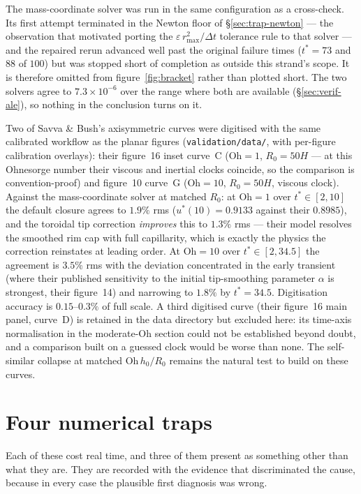 \documentclass[11pt,a4paper]{article}
\newcommand{\Oh}{\mathrm{Oh}}
\begin{document}
The mass-coordinate solver was run in the same configuration as a
cross-check. Its first attempt terminated in the Newton floor of
\S\ref{sec:trap-newton} --- the observation that motivated porting the
$\varepsilon\,r_{\max}^{2}/\Delta t$ tolerance rule to that solver --- and the
repaired rerun advanced well past the original failure times ($t^{*} = 73$ and
$88$ of $100$) but was stopped short of completion as outside this strand's
scope. It is therefore omitted from figure~\ref{fig:bracket} rather than
plotted short. The two solvers agree to $7.3\times10^{-6}$ over the range where
both are available (\S\ref{sec:verif-ale}), so nothing in the conclusion turns
on it.

Two of Savva \& Bush's axisymmetric curves were digitised with the same
calibrated workflow as the planar figures (\texttt{validation/data/}, with
per-figure calibration overlays): their figure~16 inset curve~C
($\Oh = 1$, $R_{0} = 50H$ --- at this Ohnesorge number their
viscous and inertial clocks coincide, so the comparison is
convention-proof) and figure~10 curve~G ($\Oh = 10$,
$R_{0} = 50H$, viscous clock). Against the mass-coordinate solver at matched
$R_{0}$: at $\Oh = 1$ over $t^{*} \in [2, 10]$ the default
closure agrees to $1.9\%$ rms ($u^{*}(10) = 0.9133$ against their $0.8985$),
and the toroidal tip correction \emph{improves} this to $1.3\%$ rms --- their
model resolves the smoothed rim cap with full capillarity, which is exactly
the physics the correction reinstates at leading order. At
$\Oh = 10$ over $t^{*} \in [2, 34.5]$ the agreement is
$3.5\%$ rms with the deviation concentrated in the early transient
(where their published sensitivity to the initial tip-smoothing parameter
$\alpha$ is strongest, their figure~14) and narrowing to $1.8\%$ by
$t^{*} = 34.5$. Digitisation accuracy is $0.15$--$0.3\%$ of full scale. A
third digitised curve (their figure~16 main panel, curve~D) is retained in
the data directory but excluded here: its time-axis normalisation in the
moderate-Oh section could not be established beyond doubt, and a comparison
built on a guessed clock would be worse than none. The self-similar collapse
at matched $\Oh\,h_{0}/R_{0}$ remains the natural test to build on these
curves.

\section{Four numerical traps}
\label{sec:traps}

Each of these cost real time, and three of them present as something other than
what they are. They are recorded with the evidence that discriminated the cause,
because in every case the plausible first diagnosis was wrong.
\end{document}
